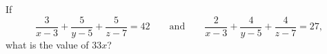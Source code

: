 If
\[\dfrac{3}{x-3}+\dfrac{5}{y-5}+\dfrac{5}{z-7}=42\qquad\text{and}\qquad\dfrac{2}{x-3}+\dfrac{4}{y-5}+\dfrac{4}{z-7}=27,\]
what is the value of $33x$?
